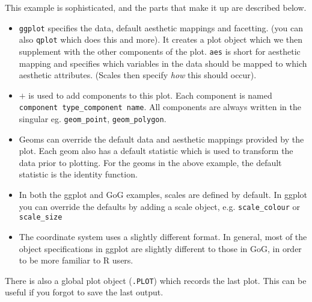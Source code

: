 \noindent This example is sophisticated, and the parts that make it up are described below.

\begin{itemize}
	\item {\tt ggplot} specifies the data, default aesthetic mappings and facetting. (you can also {\tt qplot} which does this and more).  It creates a plot object which we then supplement with the other components of the plot.  {\tt aes} is short for aesthetic mapping and specifies which variables in the data should be mapped to which aesthetic attributes.  (Scales then specify {\em how} this should occur).
	
	\item $+$ is used to add components to this plot.  Each component is named {\tt component type\_component name}.  All components are always written in the singular eg. {\tt geom\_point}, {\tt geom\_polygon}.
	
	\item Geoms can override the default data and aesthetic mappings provided by the plot.  Each geom also has a default statistic which is used to transform the data prior to plotting.  For the geoms in the above example, the default statistic is the identity function.  
		
	\item In both the ggplot and GoG examples, scales are defined by default.  In ggplot you can override the defaults by adding a scale object, e.g. {\tt scale\_colour} or {\tt scale\_size}
	
	\item The coordinate system uses a slightly different format.  In general, most of the object specifications in ggplot are slightly different to those in GoG, in order to be more familiar to R users.
\end{itemize}

There is also a global plot object ({\tt .PLOT}) which records the last plot.  This can be useful if you forgot to save the last output.

